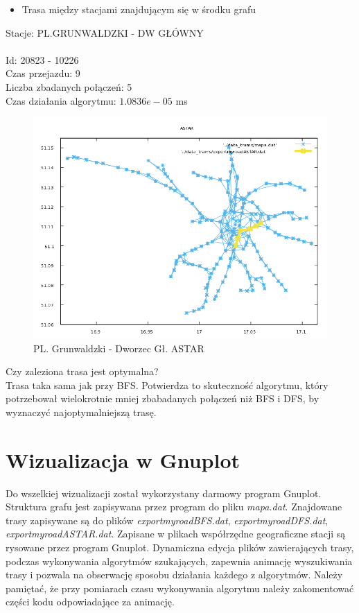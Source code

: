 \documentclass[13pt]{article}
\begin{document}
\newpage
\begin{itemize}
\item Trasa między stacjami znajdującym się w środku grafu
\end{itemize}
\hspace{1.5cm} Stacje: PL.GRUNWALDZKI - DW GŁÓWNY \\\\
Id: 20823  - 10226\\
Czas przejazdu: 9\\
Liczba zbadanych połączeń: 5\\
Czas działania algorytmu: $1.0836e-05$ ms\\
\begin{figure}[hp]
\centering
\includegraphics[width=1\textwidth]{wykresy/PLA_GLO_ASTAR.png}
\caption{PL. Grunwaldzki - Dworzec Gł. ASTAR}
\end{figure}

Czy zaleziona trasa jest optymalna?\\
Trasa taka sama jak przy BFS. Potwierdza to skuteczność algorytmu, który potrzebował wielokrotnie mniej zbabadanych połączeń niż BFS i DFS, by wyznaczyć najoptymalniejszą trasę.

\newpage

\section{Wizualizacja w Gnuplot}
Do wszelkiej wizualizacji został wykorzystany darmowy program Gnuplot. Struktura grafu jest zapisywana przez program do pliku \textit{mapa.dat}. Znajdowane trasy zapisywane są do plików \textit{exportmyroadBFS.dat}, \textit{exportmyroadDFS.dat}, \textit{exportmyroadASTAR.dat}. Zapisane w plikach współrzędne geograficzne stacji są rysowane przez program Gnuplot. Dynamiczna edycja plików zawierających trasy, podczas wykonywania algorytmów szukających, zapewnia animację wyszukiwania trasy i pozwala na obserwację sposobu działania każdego z algorytmów. Należy pamiętać, że przy pomiarach czasu wykonywania algorytmu należy zakomentować części kodu odpowiadające za animację.
\end{document}
